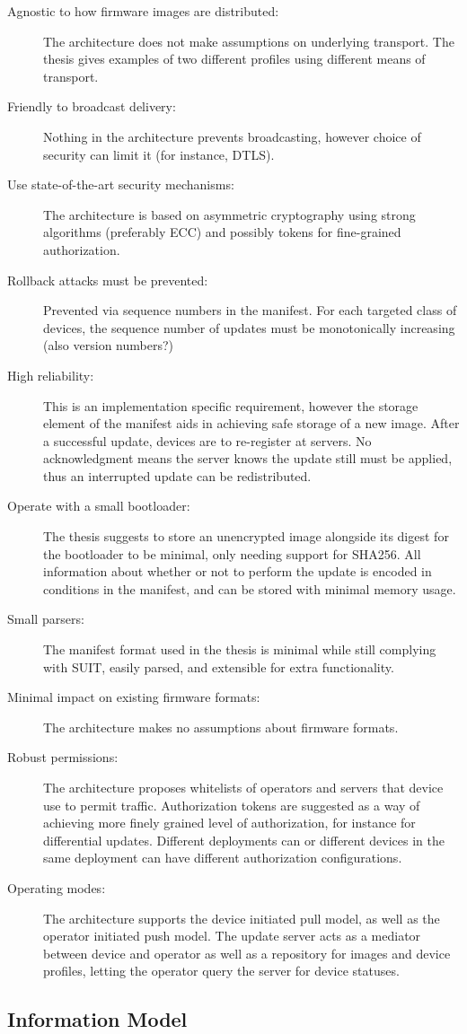 \documentclass[0-thesis.tex]{subfiles}
\begin{document}
\begin{description}
    \item[Agnostic to how firmware images are distributed:]
        The architecture does not make assumptions on underlying transport. The thesis
        gives examples of two different profiles using different means of transport.
    \item[Friendly to broadcast delivery:]
        Nothing in the architecture prevents broadcasting, however choice of security can
        limit it (for instance, DTLS).
    \item[Use state-of-the-art security mechanisms:]
        The architecture is based on asymmetric cryptography using strong algorithms
        (preferably ECC) and possibly tokens for fine-grained authorization. 
    \item[Rollback attacks must be prevented:]
        Prevented via sequence numbers in the manifest. For each targeted class of
        devices, the sequence number of updates must be monotonically increasing (also
        version numbers?)
    \item[High reliability:]
        This is an implementation specific requirement, however the storage element of the
        manifest aids in achieving safe storage of a new image. After a successful update,
        devices are to re-register at servers. No acknowledgment means the server knows
        the update still must be applied, thus an interrupted update can be redistributed.
    \item[Operate with a small bootloader:]
        The thesis suggests to store an unencrypted image alongside its digest for the
        bootloader to be minimal, only needing support for SHA256. All information about
        whether or not to perform the update is encoded in conditions in the manifest, and
        can be stored with minimal memory usage.  
    \item[Small parsers:]
        The manifest format used in the thesis is minimal while still complying with SUIT,
        easily parsed, and extensible for extra functionality.
    \item[Minimal impact on existing firmware formats:]
        The architecture makes no assumptions about firmware formats.
    \item[Robust permissions:]
        The architecture proposes whitelists of operators and servers that device use to
        permit traffic. Authorization tokens are suggested as a way of achieving more
        finely grained level of authorization, for instance for differential updates.
        Different deployments can or different devices in the same deployment can have
        different authorization configurations.
    \item[Operating modes:]
        The architecture supports the device initiated pull model, as well as the operator
        initiated push model. The update server acts as a mediator between device and
        operator as well as a repository for images and device profiles, letting the
        operator query the server for device statuses.
\end{description}
  
\subsection{Information Model}
\label{ssec:information-evaluation}
  
\end{document}
